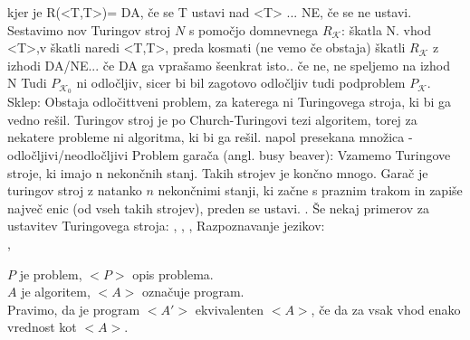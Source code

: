 \documentclass[10pt,a4paper,oneside]{book}
\begin{document}
\begin{neurejeno}
{{kjer je R(<T,T>)= DA, če se T ustavi nad <T> ... NE, če se ne ustavi.
Sestavimo nov Turingov stroj $N$ s pomočjo domnevnega $R_\mathcal{K}$:
\fixme škatla N. vhod <T>,v škatli naredi <T,T>, preda kosmati (ne vemo če obstaja) škatli $R_\mathcal{K}$ z izhodi DA/NE... če DA ga vprašamo šeenkrat isto.. če ne, ne speljemo na izhod N
}%
Tudi $P_{\mathcal{K}_0}$ ni odločljiv, sicer bi bil zagotovo odločljiv tudi podproblem $P_\mathcal{K}$.
Sklep: Obstaja odločittveni problem, za katerega ni Turingovega stroja, ki bi ga vedno rešil.%
Turingov stroj je po Church-Turingovi tezi algoritem, torej za nekatere probleme ni algoritma, ki bi ga rešil.
}
\fixme napol presekana množica - odločljivi/neodločljivi
Problem garača (angl. busy beaver):
Vzamemo Turingove stroje, ki imajo n nekončnih stanj. Takih strojev je končno mnogo. Garač je turingov stroj z natanko $n$ nekončnimi stanji, ki začne s praznim trakom in zapiše največ enic (od vseh takih strojev), preden se ustavi.
.
\br
Še nekaj primerov za ustavitev Turingovega stroja: , , , 
\br
Razpoznavanje jezikov:\\
,\\

$P$ je problem, $<P>$ opis problema.\\
$A$ je algoritem, $<A>$ označuje program.\\
\br
Pravimo, da je program $<A'>$ ekvivalenten $<A>$, če da za vsak vhod enako vrednost kot $<A>$.\\


\end{neurejeno}
\end{document}
